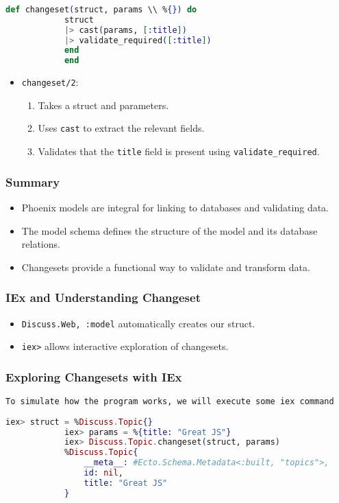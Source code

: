 \documentclass[aspectratio=169, table]{beamer}
\begin{document}
	\begin{frame}[fragile]
		\frametitle{}
		\begin{lstlisting}[language=Elixir]
			def changeset(struct, params \\ %{}) do
			struct
			|> cast(params, [:title])
			|> validate_required([:title])
			end
			end
		\end{lstlisting}
		\begin{itemize}
			\item \texttt{changeset/2}:
			\begin{enumerate}
				\item Takes a struct and parameters.
				\item Uses \texttt{cast} to extract the relevant fields.
				\item Validates that the \texttt{title} field is present using \texttt{validate\_required}.
			\end{enumerate}
		\end{itemize}
	\end{frame}
	
	\begin{frame}
		\frametitle{Summary}
		\begin{itemize}
			\item Phoenix models are integral for linking to databases and validating data.
			\item The model schema defines the structure of the model and its database relations.
			\item Changesets provide a functional way to validate and transform data.
		\end{itemize}
	\end{frame}
	
	\begin{frame}
		\frametitle{IEx and Understanding Changeset}
		\begin{itemize}
			\item \texttt{Discuss.Web, :model} automatically creates our struct.
			\item \texttt{iex>} allows interactive exploration of changesets.
		\end{itemize}
	\end{frame}
	
	\begin{frame}[fragile]
		\frametitle{Exploring Changesets with IEx}
		\texttt{To simulate how the program works, we will execute some iex command}
		\begin{lstlisting}[language=Elixir]
			iex> struct = %Discuss.Topic{}
			iex> params = %{title: "Great JS"}
			iex> Discuss.Topic.changeset(struct, params)
			%Discuss.Topic{
				__meta__: #Ecto.Schema.Metadata<:built, "topics">,
				id: nil,
				title: "Great JS"
			}
		\end{lstlisting}
	\end{frame}
	
\end{document}
